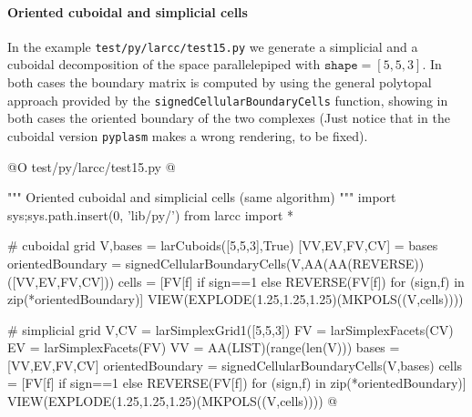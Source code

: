\documentclass[11pt,oneside]{article}	%
\begin{document}
\paragraph{Oriented cuboidal and simplicial cells}
In the example \texttt{test/py/larcc/test15.py} we generate a simplicial and a cuboidal decomposition of the space parallelepiped with $\texttt{shape}=[5,5,3]$.
In both cases the boundary matrix is computed by using the general polytopal approach provided by the \texttt{signedCellularBoundaryCells} function, showing in both cases the oriented boundary of the two complexes
(Just notice that in the cuboidal version \texttt{pyplasm} makes a wrong rendering, to be fixed).

@O test/py/larcc/test15.py
@{""" Oriented cuboidal and simplicial cells (same algorithm) """
import sys;sys.path.insert(0, 'lib/py/')
from larcc import *

# cuboidal grid
V,bases = larCuboids([5,5,3],True)
[VV,EV,FV,CV] = bases
orientedBoundary = signedCellularBoundaryCells(V,AA(AA(REVERSE))([VV,EV,FV,CV]))
cells = [FV[f] if sign==1 else REVERSE(FV[f])  for (sign,f) in zip(*orientedBoundary)]
VIEW(EXPLODE(1.25,1.25,1.25)(MKPOLS((V,cells))))

# simplicial grid
V,CV = larSimplexGrid1([5,5,3])
FV = larSimplexFacets(CV)
EV = larSimplexFacets(FV)
VV = AA(LIST)(range(len(V)))
bases = [VV,EV,FV,CV]
orientedBoundary = signedCellularBoundaryCells(V,bases)
cells = [FV[f] if sign==1 else REVERSE(FV[f])  for (sign,f) in zip(*orientedBoundary)]
VIEW(EXPLODE(1.25,1.25,1.25)(MKPOLS((V,cells))))
@}
\end{document}
